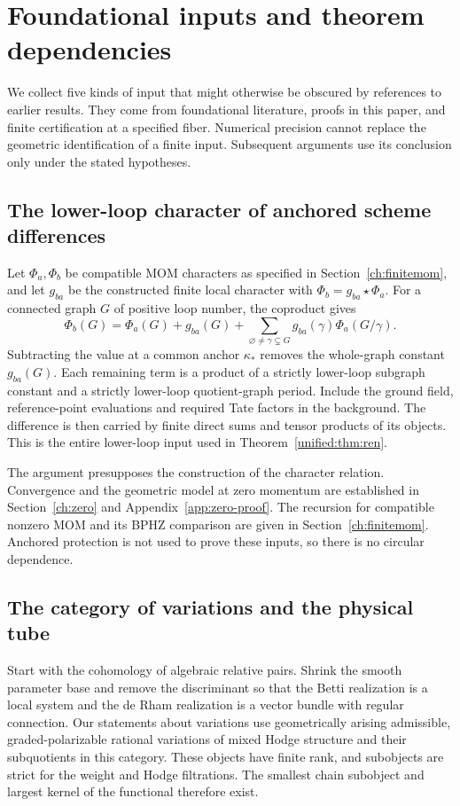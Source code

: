 \documentclass[11pt,a4paper,oneside]{article}
\theoremstyle{plain}
\theoremstyle{definition}
\theoremstyle{remark}
\numberwithin{equation}{section}
\begin{document}
\appendix

\section{Foundational inputs and theorem dependencies}\label{app:inputs}\label{app:evidence}
We collect five kinds of input that might otherwise be obscured by references to earlier results. They come from foundational literature, proofs in this paper, and finite certification at a specified fiber. Numerical precision cannot replace the geometric identification of a finite input. Subsequent arguments use its conclusion only under the stated hypotheses.

\subsection{The lower-loop character of anchored scheme differences}
Let $\Phi_a,\Phi_b$ be compatible MOM characters as specified in Section~\ref{ch:finitemom}, and let $g_{ba}$ be the constructed finite local character with $\Phi_b=g_{ba}\star\Phi_a$. For a connected graph $G$ of positive loop number, the coproduct gives
\[
 \Phi_b(G)=\Phi_a(G)+g_{ba}(G)
 +\sum_{\varnothing\ne\gamma\subsetneq G}g_{ba}(\gamma)\Phi_a(G/\gamma).
\]
Subtracting the value at a common anchor $\kappa_*$ removes the whole-graph constant $g_{ba}(G)$. Each remaining term is a product of a strictly lower-loop subgraph constant and a strictly lower-loop quotient-graph period. Include the ground field, reference-point evaluations and required Tate factors in the background. The difference is then carried by finite direct sums and tensor products of its objects. This is the entire lower-loop input used in Theorem~\ref{unified:thm:ren}.

The argument presupposes the construction of the character relation. Convergence and the geometric model at zero momentum are established in Section~\ref{ch:zero} and Appendix~\ref{app:zero-proof}. The recursion for compatible nonzero MOM and its BPHZ comparison are given in Section~\ref{ch:finitemom}. Anchored protection is not used to prove these inputs, so there is no circular dependence.

\subsection{The category of variations and the physical tube}
Start with the cohomology of algebraic relative pairs. Shrink the smooth parameter base and remove the discriminant so that the Betti realization is a local system and the de Rham realization is a vector bundle with regular connection. Our statements about variations use geometrically arising admissible, graded-polarizable rational variations of mixed Hodge structure and their subquotients in this category. These objects have finite rank, and subobjects are strict for the weight and Hodge filtrations. The smallest chain subobject and largest kernel of the functional therefore exist.
\end{document}

